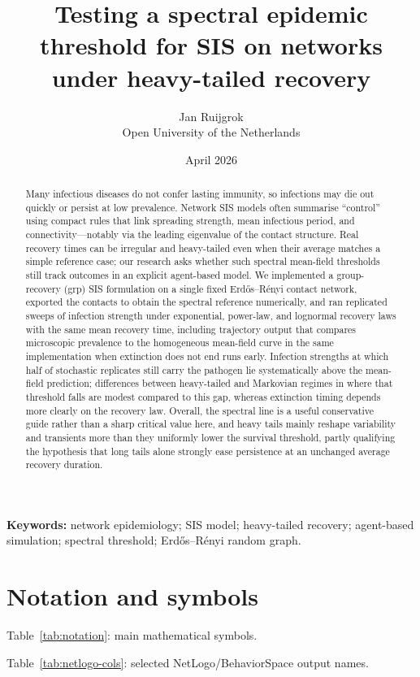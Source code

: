 \documentclass[11pt,a4paper]{article}
\title{Testing a spectral epidemic threshold for SIS on networks under heavy-tailed recovery}
\author{Jan Ruijgrok\\
  Open University of the Netherlands}
\date{April 2026}
\begin{document}
\maketitle

\begin{abstract}
Many infectious diseases do not confer lasting immunity, so infections may die out quickly or persist at low prevalence. Network SIS models often summarise ``control'' using compact rules that link spreading strength, mean infectious period, and connectivity---notably via the leading eigenvalue of the contact structure. Real recovery times can be irregular and heavy-tailed even when their average matches a simple reference case; our research asks whether such spectral mean-field thresholds still track outcomes in an explicit agent-based model. We implemented a group-recovery (grp) SIS formulation on a single fixed Erd\H{o}s--R\'enyi contact network, exported the contacts to obtain the spectral reference numerically, and ran replicated sweeps of infection strength under exponential, power-law, and lognormal recovery laws with the same mean recovery time, including trajectory output that compares microscopic prevalence to the homogeneous mean-field curve in the same implementation when extinction does not end runs early. Infection strengths at which half of stochastic replicates still carry the pathogen lie systematically above the mean-field prediction; differences between heavy-tailed and Markovian regimes in where that threshold falls are modest compared to this gap, whereas extinction timing depends more clearly on the recovery law. Overall, the spectral line is a useful conservative guide rather than a sharp critical value here, and heavy tails mainly reshape variability and transients more than they uniformly lower the survival threshold, partly qualifying the hypothesis that long tails alone strongly ease persistence at an unchanged average recovery duration.
\end{abstract}

\noindent\textbf{Keywords:} network epidemiology; SIS model; heavy-tailed recovery; agent-based simulation; spectral threshold; Erd\H{o}s--R\'enyi random graph.

\section*{Notation and symbols}
{}

\noindent
Table~\ref{tab:notation}: main mathematical symbols.\par
\noindent
Table~\ref{tab:netlogo-cols}: selected NetLogo/BehaviorSpace output names.
\end{document}
